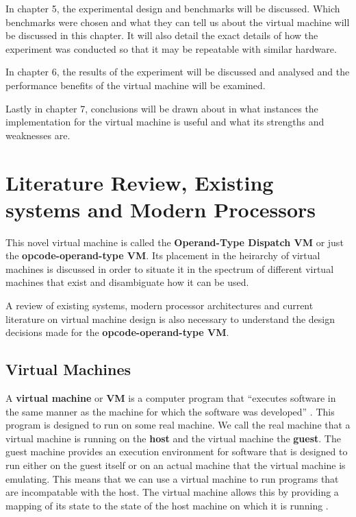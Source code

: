 \documentclass[english,a4paper]{article}
\begin{document}
In chapter 5, the experimental design and benchmarks will be
discussed. Which benchmarks were chosen and what they can tell us
about the virtual machine will be discussed in this chapter. It will
also detail the exact details of how the experiment was conducted so
that it may be repeatable with similar hardware.

In chapter 6, the results of the experiment will be discussed and
analysed and the performance benefits of the virtual machine will be
examined.

Lastly in chapter 7, conclusions will be drawn about in what instances
the implementation for the virtual machine is useful and what its
strengths and weaknesses are.
\newpage{}

\section{Literature Review, Existing systems and Modern Processors}
This novel virtual machine is called the \textbf{Operand-Type Dispatch VM} or just the \textbf{opcode-operand-type VM}. Its
placement in the heirarchy of virtual machines is discussed in order
to situate it in the spectrum of different virtual machines that exist
and disambiguate how it can be used.

A review of existing systems, modern processor architectures and
current literature on virtual machine design is also necessary to
understand the design decisions made for the \textbf{opcode-operand-type
  VM}.

\subsection{Virtual Machines}
A \textbf{virtual machine} or \textbf{VM} is a computer program that
``executes software in the same manner as the machine for which the
software was developed'' \cite[pg9]{JamesE.Smith2005}. This program is
designed to run on some real machine. We call the real machine that a
virtual machine is running on the \textbf{host} and the virtual machine
the \textbf{guest}. The guest machine provides an execution environment
for software that is designed to run either on the guest itself or on
an actual machine that the virtual machine is emulating. This means
that we can use a virtual machine to run programs that are
incompatable with the host. The virtual machine allows this by
providing a mapping of its state to the state of the host machine on
which it is running \cite[pg4]{JamesE.Smith2005}.
\end{document}
